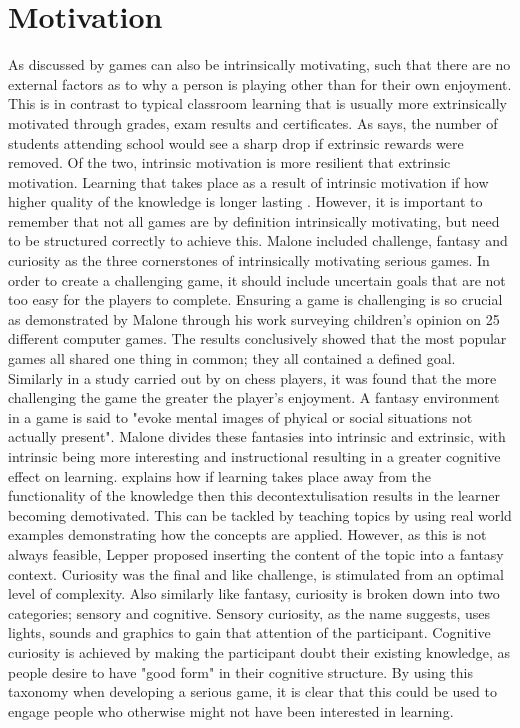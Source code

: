 \documentclass[12pt,a4paper]{report}
\begin{document}
\section{Motivation}
As discussed by \cite{malone1981toward} games can also be intrinsically motivating, such that there are no external factors as to why a person is playing other than for their own enjoyment. This is in contrast to typical classroom learning that is usually more extrinsically motivated through grades, exam results and certificates. As  \citep{csikszentmihalyi1997talented} says, the number of students attending school would see a sharp drop if extrinsic rewards were removed. Of the two, intrinsic motivation is more resilient that extrinsic motivation. Learning that takes place as a result of intrinsic motivation if how higher quality of the knowledge is longer lasting \citep{kawachi2003initiating}. However, it is important to remember that not all games are by definition intrinsically motivating, but need to be structured correctly to achieve this. Malone included challenge, fantasy and curiosity as the three cornerstones of intrinsically motivating serious games.  In order to create a challenging game, it should include uncertain goals that are not too easy for the players to complete. Ensuring a game is challenging is so crucial as demonstrated by Malone through his work surveying children's opinion on 25 different computer games. The results conclusively showed that the most popular games all shared one thing in common; they all contained a defined goal.  Similarly in a study carried out by \citep{abuhamdeh2012importance} on chess players, it was found that the more challenging the game the greater the player's enjoyment. A fantasy environment in a game is said to "evoke mental images of phyical or social situations not actually present". Malone divides these fantasies into intrinsic and extrinsic, with intrinsic being more interesting and instructional resulting in a  greater cognitive effect on learning. \citep{lepper1988motivational} explains how if learning takes place away from the functionality of the knowledge then this decontextulisation results in the learner becoming demotivated.  This can be tackled by teaching topics by using real world examples demonstrating how the concepts are applied.  However, as this is not always feasible, Lepper proposed inserting the content of the topic into a fantasy context. Curiosity was the final and like challenge, is stimulated from an optimal level of complexity. Also similarly like fantasy, curiosity is  broken down into two categories; sensory and cognitive.  Sensory curiosity, as the name suggests, uses lights, sounds and graphics to gain that attention of the participant. Cognitive curiosity is achieved by making the participant doubt their existing knowledge, as people desire to have "good form" in their cognitive structure.   By using this taxonomy when developing a serious game, it is clear that this could be used to engage people who otherwise might not have been interested in learning. 





 
\end{document}
